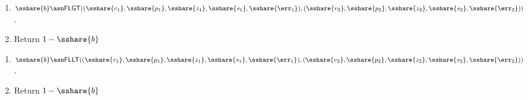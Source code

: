   \begin{enumerate}
    \item $\sshare{b} \asn \mathsf{FLGT}(
            (\sshare{v_1},\sshare{p_1},\sshare{z_1},\sshare{s_1},\sshare{\err_1}),
            (\sshare{v_2},\sshare{p_2},\sshare{z_2},\sshare{s_2},\sshare{\err_2}))$.
    \item Return $1 - \sshare{b}$%
  \end{enumerate}

\begin{enumerate}
  \item $\sshare{b} \asn \mathsf{FLLT}(
          (\sshare{v_1},\sshare{p_1},\sshare{z_1},\sshare{s_1},\sshare{\err_1}),
          (\sshare{v_2},\sshare{p_2},\sshare{z_2},\sshare{s_2},\sshare{\err_2}))$.
  \item Return $1 - \sshare{b}$%
\end{enumerate}


